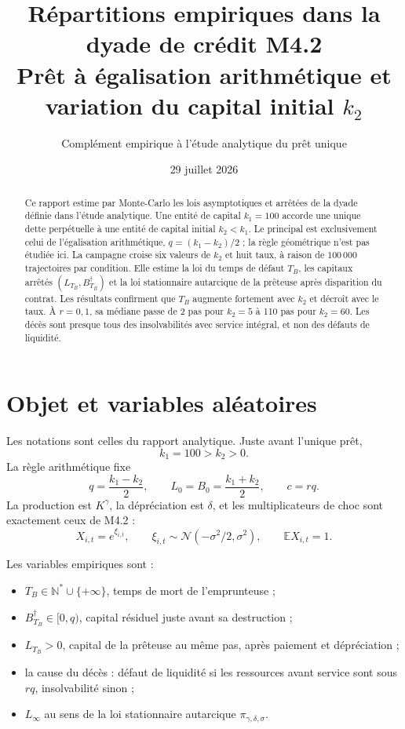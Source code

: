 \documentclass[11pt,a4paper]{article}
\title{Répartitions empiriques dans la dyade de crédit M4.2\\
\large Prêt à égalisation arithmétique et variation du capital initial $k_2$}
\author{Complément empirique à l'étude analytique du prêt unique}
\date{29 juillet 2026}
\newcommand{\E}{\mathbb E}
\begin{document}
\maketitle

\begin{abstract}
Ce rapport estime par Monte-Carlo les lois asymptotiques et arrêtées de la
dyade définie dans l'étude analytique. Une entité de capital $k_1=100$
accorde une unique dette perpétuelle à une entité de capital initial
$k_2<k_1$. Le principal est exclusivement celui de l'égalisation
arithmétique, $q=(k_1-k_2)/2$ ; la règle géométrique n'est pas étudiée ici.
La campagne croise six valeurs de $k_2$ et huit taux, à raison de
$100\,000$ trajectoires par condition. Elle estime la loi du temps de
défaut $T_B$, les capitaux arrêtés $(L_{T_B},B_{T_B}^{\dagger})$ et la loi
stationnaire autarcique de la prêteuse après disparition du contrat. Les
résultats confirment que $T_B$ augmente fortement avec $k_2$ et décroît
avec le taux. À $r=0{,}1$, sa médiane passe de 2 pas pour $k_2=5$ à 110
pas pour $k_2=60$. Les décès sont presque tous des insolvabilités avec
service intégral, et non des défauts de liquidité.
\end{abstract}

\tableofcontents

\section{Objet et variables aléatoires}

Les notations sont celles du rapport analytique. Juste avant l'unique prêt,
\[
k_1=100>k_2>0.
\]
La règle arithmétique fixe
\begin{equation}
q=\frac{k_1-k_2}{2},\qquad
L_0=B_0=\frac{k_1+k_2}{2},\qquad c=rq.
\label{eq:initial}
\end{equation}
La production est $K^\gamma$, la dépréciation est $\delta$, et les
multiplicateurs de choc sont exactement ceux de M4.2 :
\begin{equation}
X_{i,t}=e^{\xi_{i,t}},\qquad
\xi_{i,t}\sim\mathcal N(-\sigma^2/2,\sigma^2),
\qquad \E X_{i,t}=1.
\label{eq:shock}
\end{equation}

Les variables empiriques sont :
\begin{itemize}
\item $T_B\in\mathbb N^*\cup\{+\infty\}$, temps de mort de
l'emprunteuse ;
\item $B_{T_B}^{\dagger}\in[0,q)$, capital résiduel juste avant sa
destruction ;
\item $L_{T_B}>0$, capital de la prêteuse au même pas, après paiement et
dépréciation ;
\item la cause du décès : défaut de liquidité si les ressources avant
service sont sous $rq$, insolvabilité sinon ;
\item $L_\infty$ au sens de la loi stationnaire autarcique
$\pi_{\gamma,\delta,\sigma}$.
\end{itemize}
\end{document}
